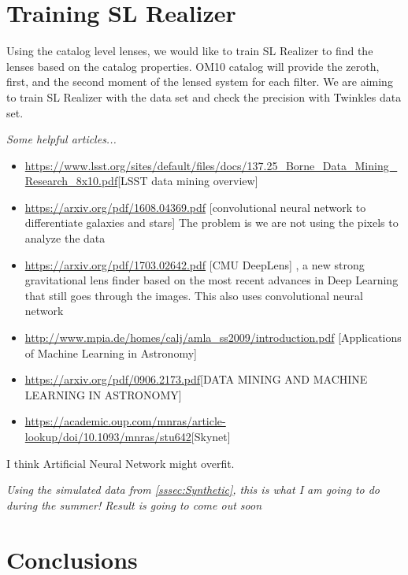 \documentclass[\docopts]{\docclass}
\begin{document}
\section{Training SL Realizer}
\label{sec:sl_realizer_train}

Using the catalog level lenses, we would like to train SL Realizer to find the lenses based on the catalog properties. OM10 catalog will provide the zeroth, first, and the second moment of the lensed system for each filter. We are aiming to train SL Realizer with the data set and check the precision with Twinkles data set.

\textit{Some helpful articles...}

\begin{itemize}
  \item \url{https://www.lsst.org/sites/default/files/docs/137.25_Borne_Data_Mining_Research_8x10.pdf}[LSST data mining overview]
 \item \url{https://arxiv.org/pdf/1608.04369.pdf} [convolutional neural network to differentiate galaxies and stars] The problem is we are not using the pixels to analyze the data
 \item \url{https://arxiv.org/pdf/1703.02642.pdf} [CMU DeepLens] , a new strong gravitational lens finder based on the most recent advances in Deep Learning that still goes through the images. This also uses convolutional neural network
  \item \url{http://www.mpia.de/homes/calj/amla_ss2009/introduction.pdf} [Applications of Machine Learning in Astronomy]
  \item \url{https://arxiv.org/pdf/0906.2173.pdf}[DATA MINING AND MACHINE LEARNING IN ASTRONOMY]
  \item \url{https://academic.oup.com/mnras/article-lookup/doi/10.1093/mnras/stu642}[Skynet]
  
  
\end{itemize}

I think Artificial Neural Network might overfit.



\textit{Using the simulated data from \ref{sssec:Synthetic}, this is what I am going to do during the summer! Result is going to come out soon }


\section{Conclusions}
\label{sec:conclusions}
\end{document}

